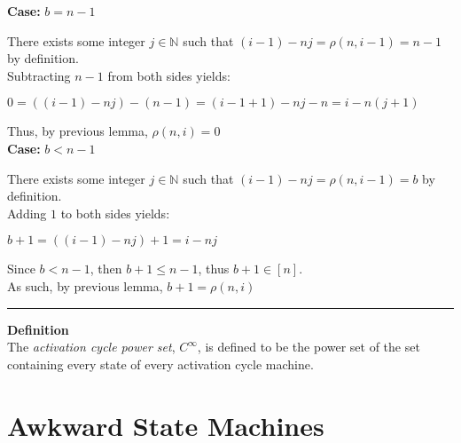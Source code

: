 \documentclass[a4paper,12pt]{article}
\begin{document}
\noindent
\textbf{Case:} $b = n - 1$

\noindent There exists some integer $j \in \mathbb{N}$ such that $(i - 1) - nj = \rho(n, i - 1) = n - 1$ by definition.\\

\noindent Subtracting $n - 1$ from both sides yields:
\begin{center}
$0 = ((i - 1) - nj) - (n - 1) = (i - 1 + 1) - nj - n = i - n(j + 1)$
\end{center}

\noindent Thus, by previous lemma, $\rho(n, i) = 0$\\


\noindent
\textbf{Case:} $b < n - 1$

\noindent There exists some integer $j \in \mathbb{N}$ such that $(i - 1) - nj = \rho(n, i - 1) = b$ by definition.\\

\noindent Adding $1$ to both sides yields:
\begin{center}
$b + 1 = ((i - 1) - nj) + 1 = i - nj$
\end{center}

\noindent Since $b < n - 1$, then $b + 1 \leq n - 1$, thus $b + 1 \in [n]$.\\

\noindent As such, by previous lemma, $b + 1 = \rho(n, i)$


\begin{center}
\noindent\rule{8cm}{0.4pt}
\end{center}








\label{definition:activation_cycle_power_set}
\hypertarget{definition:activation_cycle_power_set}{}
\begin{tcolorbox}
\textbf{Definition}\\
The \textit{activation cycle power set}, $C^{\infty}$, is defined to be the power set of the set containing every state of every activation cycle machine.
\end{tcolorbox}








\section{Awkward State Machines}
\label{section:awkward_state_machines}
\hypertarget{section:awkward_state_machines}{}
\end{document}
